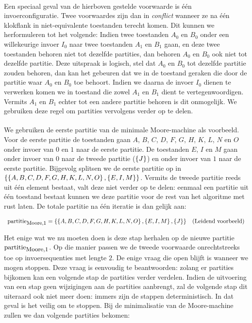 \paragraph{}
Een speciaal geval van de hierboven gestelde voorwaarde is \'e\'en invoerconfiguratie. Twee voorwaardes zijn dan in \emph{conflict} wanneer ze na \'e\'en klokflank in niet-equivalente toestanden terecht komen. Dit kunnen we herformuleren tot het volgende: Indien twee toestanden $A_0$ en $B_0$ onder een willekeurige invoer $I_0$ naar twee toestanden $A_1$ en $B_1$ gaan, en deze twee toestanden behoren niet tot dezelfde partities, dan behoren $A_0$ en $B_0$ ook niet tot dezelfde partitie. Deze uitspraak is logisch, stel dat $A_0$ en $B_0$ tot dezelfde partitie zouden behoren, dan kan het gebeuren dat we in de toestand geraken die door de partitie waar $A_0$ en $B_0$ toe behoort. Indien we daarna de invoer $I_0$ dienen te verwerken komen we in toestand die zowel $A_1$ en $B_1$ dient te vertegenwoordigen. Vermits $A_1$ en $B_1$ echter tot een andere partitie behoren is dit onmogelijk. We gebruiken deze regel om partities vervolgens verder op te delen.

\paragraph{}
We gebruiken de eerste partitie van de minimale Moore-machine als voorbeeld. Voor de eerste partitie de toestanden gaan $A$, $B$, $C$, $D$, $F$, $G$, $H$, $K$, $L$, $N$ en $O$ onder invoer van $0$ en $1$ naar de eerste partitie. De toestanden $E$, $I$ en $M$ gaan onder invoer van $0$ naar de tweede partitie ($\left\{ J \right\}$) en onder invoer van $1$ naar de eerste partitie. Bijgevolg splitsen we de eerste partitie op in $\left\{ \left\{ A,B,C,D,F,G,H,K,L,N,O \right\},\left\{ E,I,M \right\} \right\}$. Vermits de tweede partitie reeds uit \'e\'en element bestaat, valt deze niet verder op te delen: eenmaal een partitie uit \'e\'en toestand bestaat kunnen we deze partitie voor de rest van het algoritme met rust laten. De totale partitie na \'e\'en iteratie is dan gelijk aan:

\begin{equation}
\begin{array}{lr}
\mbox{partitie}_{\mbox{\small{Moore,1}}}=\left\{ \left\{ A,B,C,D,F,G,H,K,L,N,O \right\},\left\{ E,I,M \right\},\left\{ J \right\} \right\}&\mbox{(Leidend voorbeeld)}
\end{array}
\end{equation}

Het enige wat we nu moeten doen is deze stap herhalen op de nieuwe partitie $\mbox{partitie}_{\mbox{\small{Moore,1}}}$. Op die manier passen we de tweede voorwaarde onrechtstreeks toe op invoersequenties met lengte $2$. De enige vraag die open blijft is wanneer we mogen stoppen. Deze vraag is eenvoudig te beantwoorden: zolang er partities bijkomen kan een volgende stap de partities verder verdelen. Indien de uitvoering van een stap geen wijzigingen aan de partities aanbrengt, zal de volgende stap dit uiteraard ook niet meer doen: immers zijn de stappen deterministisch. In dat geval is het veilig om te stoppen. Bij de minimalisatie van de Moore-machine zullen we dan volgende partities bekomen:

